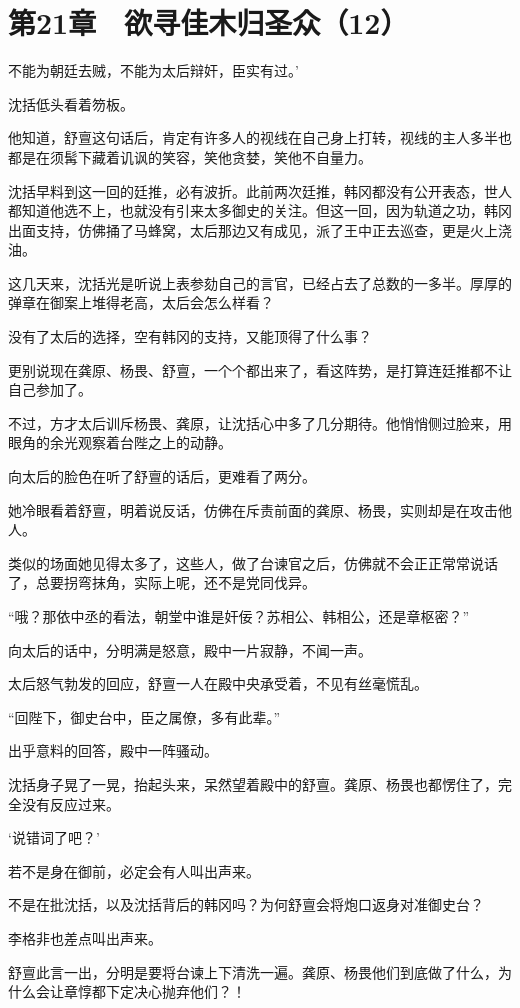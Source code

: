 \section{第21章　欲寻佳木归圣众（12）}

不能为朝廷去贼，不能为太后辩奸，臣实有过。’

沈括低头看着笏板。

他知道，舒亶这句话后，肯定有许多人的视线在自己身上打转，视线的主人多半也都是在须髯下藏着讥讽的笑容，笑他贪婪，笑他不自量力。

沈括早料到这一回的廷推，必有波折。此前两次廷推，韩冈都没有公开表态，世人都知道他选不上，也就没有引来太多御史的关注。但这一回，因为轨道之功，韩冈出面支持，仿佛捅了马蜂窝，太后那边又有成见，派了王中正去巡查，更是火上浇油。

这几天来，沈括光是听说上表参劾自己的言官，已经占去了总数的一多半。厚厚的弹章在御案上堆得老高，太后会怎么样看？

没有了太后的选择，空有韩冈的支持，又能顶得了什么事？

更别说现在龚原、杨畏、舒亶，一个个都出来了，看这阵势，是打算连廷推都不让自己参加了。

不过，方才太后训斥杨畏、龚原，让沈括心中多了几分期待。他悄悄侧过脸来，用眼角的余光观察着台陛之上的动静。

向太后的脸色在听了舒亶的话后，更难看了两分。

她冷眼看着舒亶，明着说反话，仿佛在斥责前面的龚原、杨畏，实则却是在攻击他人。

类似的场面她见得太多了，这些人，做了台谏官之后，仿佛就不会正正常常说话了，总要拐弯抹角，实际上呢，还不是党同伐异。

“哦？那依中丞的看法，朝堂中谁是奸佞？苏相公、韩相公，还是章枢密？”

向太后的话中，分明满是怒意，殿中一片寂静，不闻一声。

太后怒气勃发的回应，舒亶一人在殿中央承受着，不见有丝毫慌乱。

“回陛下，御史台中，臣之属僚，多有此辈。”

出乎意料的回答，殿中一阵骚动。

沈括身子晃了一晃，抬起头来，呆然望着殿中的舒亶。龚原、杨畏也都愣住了，完全没有反应过来。

‘说错词了吧？’

若不是身在御前，必定会有人叫出声来。

不是在批沈括，以及沈括背后的韩冈吗？为何舒亶会将炮口返身对准御史台？

李格非也差点叫出声来。

舒亶此言一出，分明是要将台谏上下清洗一遍。龚原、杨畏他们到底做了什么，为什么会让章惇都下定决心抛弃他们？！

